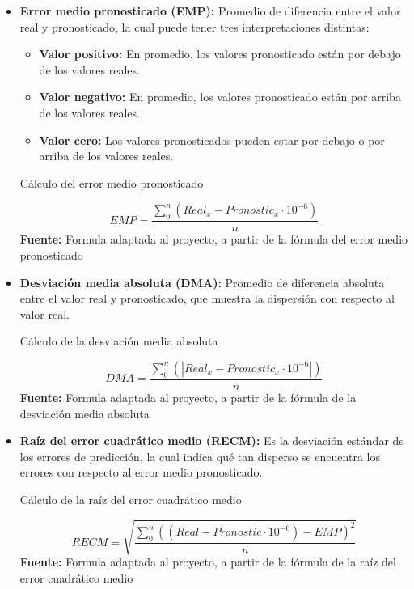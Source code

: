 \begin{itemize}
\item \textbf{Error medio pronosticado (\acrshort{EMP}):} Promedio de diferencia entre el valor real y pronosticado, la cual puede tener tres interpretaciones distintas:
	\begin{itemize}
	\item \textbf{Valor positivo:} En promedio, los valores pronosticado est\'an por debajo de los valores reales.
	\item \textbf{Valor negativo:} En promedio, los valores pronosticado est\'an por arriba de los valores reales.
	\item \textbf{Valor cero:} Los valores pronosticados pueden estar por debajo o por arriba de los valores reales.
	\end{itemize}
\begin{formula}[H]
	\centering
	\caption{C\'alculo del error medio pronosticado}
	\label{frm:empMath}
	\begin{equation}
EMP=\frac{\sum_{0}^{n}(Real_{x}-Pronostic_{x}\cdot10^{-6})}{n}
	\end{equation}
	\textbf{Fuente:} Formula adaptada al proyecto, a partir de la f\'ormula del error medio pronosticado \cite{videoErrores}
\end{formula}  
\item \textbf{Desviaci\'on media absoluta (\acrshort{DMA}):} Promedio de diferencia absoluta entre el valor real y pronosticado, que muestra la dispersi\'on con respecto al valor real.
 \begin{formula}[H]
	\centering
	\caption{C\'alculo de la desviaci\'on media absoluta}
	\label{frm:MADMath}
	\begin{equation}
DMA=\frac{\sum_{0}^{n}( \left |  Real_{x}-Pronostic_{x}\cdot10^{-6} \right |)}{n}
	\end{equation}
	\textbf{Fuente:} Formula adaptada al proyecto, a partir de la f\'ormula de la desviaci\'on media absoluta \cite{videoErrores}
\end{formula}  
\item \textbf{Ra\'iz del error cuadr\'atico medio (RECM):} Es la desviaci\'on est\'andar de los errores de predicci\'on, la cual indica qu\'e tan disperso se encuentra los errores con respecto al error medio pronosticado.
 \begin{formula}[H]
	\centering
	\caption{C\'alculo de la ra\'iz del error cuadr\'atico medio}
	\label{frm:RECMMath}
	\begin{equation}
RECM=\sqrt{\frac{\sum_{0}^{n}((Real-Pronostic\cdot10^{-6})-EMP)^{2}}{n}}
	\end{equation}
	\textbf{Fuente:} Formula adaptada al proyecto, a partir de la f\'ormula de la ra\'iz del error cuadr\'atico medio \cite{GEORCMETUT}
\end{formula}  
\end{itemize}
